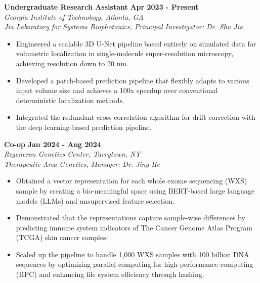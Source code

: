 \documentclass[letterpaper, 11pt]{article}
\newcommand{\subsectionvspace}{\vspace{6pt}}
\begin{document}
    \subsectionvspace

    \textbf{Undergraduate Research Assistant} \hfill 
    \textbf{Apr 2023 - Present} \\
    \textit{Georgia Institute of Technology, Atlanta, GA} \\
    \textit{Jia Laboratory for Systems Biophotonics, Principal Investigator: Dr. Shu Jia}
    \begin{itemize}
        \item Engineered a scalable 3D U-Net pipeline based entirely on simulated data for volumetric localization in single-molecule super-resolution microscopy, achieving resolution down to 20 nm.
        \item Developed a patch-based prediction pipeline that flexibly adapts to various input volume size and achieves a 100x speedup over conventional deterministic localization methods.
        \item Integrated the redundant cross-correlation algorithm for drift correction with the deep learning-based prediction pipeline.
    \end{itemize}

    \subsectionvspace

    \textbf{Co-op} \hfill 
    \textbf{Jan 2024 - Aug 2024} \\
    \textit{Regeneron Genetics Center, Tarrytown, NY} \\
    \textit{Therapeutic Area Genetics, Manager: Dr. Jing He}
    \begin{itemize}
        \item Obtained a vector representation for each whole exome sequencing (WXS) sample by creating a bio-meaningful space using BERT-based large language models (LLMs) and unsupervised feature selection.
        \item Demonstrated that the representations capture sample-wise differences by predicting immune system indicators of The Cancer Genome Atlas Program (TCGA) skin cancer samples.
        \item Scaled up the pipeline to handle 1,000 WXS samples with 100 billion DNA sequences by optimizing parallel computing for high-performance computing (HPC) and enhancing file system efficiency through hashing.
    \end{itemize}

    \subsectionvspace
\end{document}
